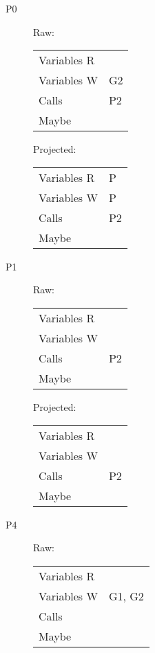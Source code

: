 \documentclass{article}
\begin{document}
\begin{description}
\item[P0]
  \begin{multicols}{2}
    Raw:
    \begin{tabular}{ll}
      Variables R & \\
      Variables W & G2 \\
      Calls       & P2 \\
      Maybe       & \\
    \end{tabular}

    Projected:
    \begin{tabular}{ll}
      Variables R & P \\
      Variables W & P \\
      Calls       & P2 \\
      Maybe       & \\
    \end{tabular}
  \end{multicols}

\item[P1]
  \begin{multicols}{2}
    Raw:
    \begin{tabular}{ll}
      Variables R & \\
      Variables W & \\
      Calls       & P2 \\
      Maybe       & \\
    \end{tabular}

    Projected:
    \begin{tabular}{ll}
      Variables R & \\
      Variables W & \\
      Calls       & P2 \\
      Maybe       & \\
    \end{tabular}
  \end{multicols}

\item[P4]
  \begin{multicols}{2}
    Raw:
    \begin{tabular}{ll}
      Variables R & \\
      Variables W & G1, G2 \\
      Calls       & \\
      Maybe       & \\
    \end{tabular}


\end{multicols}
\end{description}
\end{document}
